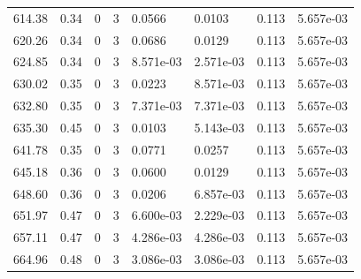 \documentclass[preview]{standalone}
\begin{document}
{{{{{\begin{tabular}{L{1.2cm}C{1.2cm} C{0.3cm}C{0.5cm} C{1.4cm}C{1.4cm} C{1.4cm}C{1.4cm}}
  614.38  &  0.34  & 0     &  3 &  0.0566  & 0.0103  & 0.113 &  5.657e-03   \\ 
  620.26  &  0.34  & 0     &  3 &  0.0686  & 0.0129  & 0.113 &  5.657e-03   \\ 
  624.85  &  0.34  & 0     &  3 &  8.571e-03  & 2.571e-03  & 0.113 &  5.657e-03   \\ 
  630.02  &  0.35  & 0     &  3 &  0.0223  & 8.571e-03  & 0.113 &  5.657e-03   \\ 
  632.80  &  0.35  & 0     &  3 &  7.371e-03  & 7.371e-03  & 0.113 &  5.657e-03   \\ 
  635.30  &  0.45  & 0     &  3 &  0.0103  & 5.143e-03  & 0.113 &  5.657e-03   \\ 
  641.78  &  0.35  & 0     &  3 &  0.0771  & 0.0257  & 0.113 &  5.657e-03   \\ 
  645.18  &  0.36  & 0     &  3 &  0.0600  & 0.0129  & 0.113 &  5.657e-03   \\ 
  648.60  &  0.36  & 0     &  3 &  0.0206  & 6.857e-03  & 0.113 &  5.657e-03   \\ 
  651.97  &  0.47  & 0     &  3 &  6.600e-03  & 2.229e-03  & 0.113 &  5.657e-03   \\ 
  657.11  &  0.47  & 0     &  3 &  4.286e-03  & 4.286e-03  & 0.113 &  5.657e-03   \\ 
  664.96  &  0.48  & 0     &  3 &  3.086e-03  & 3.086e-03  & 0.113 &  5.657e-03   \\ 
\hline 
\end{tabular} 

}}}}}
\end{document}
